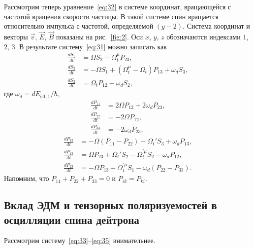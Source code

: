 \documentclass[11pt,a4paper]{article}
\begin{document}
Рассмотрим теперь уравнение~\eqref{eq:32} в системе координат, вращающейся
с частотой вращения скорости частицы. В такой системе спин вращается
относительно импульса с частотой, определяемой $(g-2)$. Система координат
и векторы $\vec{v}$, $\vec{E}$, $\vec{B}$ показаны на рис.~\ref{fig:2}.
Оси $x$, $y$, $z$ обозначаются индексами $1$, $2$, $3$. В результате
систему~\eqref{eq:31} можно записать как
\begin{equation}
\begin{aligned}
\frac{dS_1}{dt}&=\Omega S_2-\Omega_t^{\mu} P_{23},\\
\frac{dS_2}{dt}&=-\Omega S_1+(\Omega_t^{\mu}-\Omega_t)P_{13}+\omega_d S_3,\\
\frac{dS_3}{dt}&=\Omega_t P_{12}-\omega_d S_2,
\end{aligned}
\label{eq:33}
\end{equation}
где $\omega_d=d E_{\mathrm{eff},1}/\hbar$,
\begin{equation}
\begin{aligned}
\frac{dP_{11}}{dt}&=2\Omega P_{12}+2\omega_d P_{23},\\
\frac{dP_{22}}{dt}&=-2\Omega P_{12},\\
\frac{dP_{33}}{dt}&=-2\omega_d P_{23},
\end{aligned}
\label{eq:34}
\end{equation}
\begin{equation}
\begin{aligned}
\frac{dP_{12}}{dt}&=-\Omega(P_{11}-P_{22})-\Omega_t' S_3+\omega_d P_{13},\\
\frac{dP_{13}}{dt}&=\Omega P_{23}+\Omega_t' S_2-\Omega_t^{\prime\mu} S_2-\omega_d P_{12},\\
\frac{dP_{23}}{dt}&=-\Omega P_{13}+\Omega_t^{\prime\mu} S_1-\omega_d(P_{22}-P_{33}).
\end{aligned}
\label{eq:35}
\end{equation}
Напомним, что $P_{11}+P_{22}+P_{33}=0$ и $P_{ik}=P_{ki}$.

\subsection{Вклад ЭДМ и тензорных поляризуемостей в осцилляции спина дейтрона}

Рассмотрим систему~\eqref{eq:33}--\eqref{eq:35} внимательнее.
\end{document}
